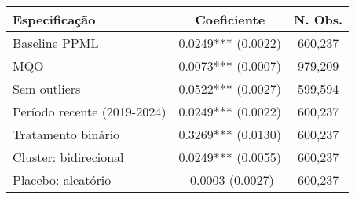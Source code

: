 \begin{tabular}{lcc}
\toprule
Especificação & Coeficiente & N. Obs. \\
\midrule
Baseline PPML & 0.0249*** (0.0022) & 600,237 \\
MQO & 0.0073*** (0.0007) & 979,209 \\
Sem outliers & 0.0522*** (0.0027) & 599,594 \\
Período recente (2019-2024) & 0.0249*** (0.0022) & 600,237 \\
Tratamento binário & 0.3269*** (0.0130) & 600,237 \\
Cluster: bidirecional & 0.0249*** (0.0055) & 600,237 \\
Placebo: aleatório & -0.0003 (0.0027) & 600,237 \\
\bottomrule
\end{tabular}

